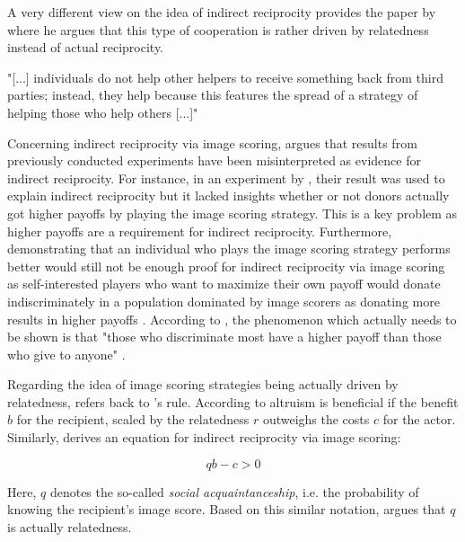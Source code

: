 \documentclass[sigconf]{acmart}
\begin{document}
    A very different view on the idea of indirect reciprocity provides the paper by \citeauthor{roberts_kin_2019} \cite{roberts_kin_2019} where he argues that this type of cooperation is rather driven by relatedness instead of actual reciprocity.

    "[...] individuals do not help other helpers to receive something back from third parties; instead, they help because this features the spread of a strategy of helping those who help others [...]" \cite{roberts_kin_2019}


    Concerning indirect reciprocity via image scoring, \citeauthor{roberts_kin_2019} argues that results from previously conducted experiments have been misinterpreted as evidence for indirect reciprocity.
    For instance, in an experiment by \citeauthor{milinski_reputation_2002} \cite{milinski_reputation_2002}, their result was used to explain indirect reciprocity but it lacked insights whether or not donors actually got higher payoffs by playing the image scoring strategy.
    This is a key problem as higher payoffs are a requirement for indirect reciprocity.
    Furthermore, demonstrating that an individual who plays the image scoring strategy performs better would still not be enough proof for indirect reciprocity via image scoring as self-interested players who want to maximize their own payoff would donate indiscriminately in a population dominated by image scorers as donating more results in higher payoffs \cite{roberts_kin_2019}.
    According to \citeauthor{roberts_kin_2019}, the phenomenon which actually needs to be shown is that "those who discriminate most have a higher payoff than those who give to anyone" \cite{roberts_kin_2019}.

    Regarding the idea of image scoring strategies being actually driven by relatedness, \citeauthor{roberts_kin_2019} refers back to \citeauthor{hamilton_kin_1964}'s rule.
    According to  altruism is beneficial if the benefit $b$ for the recipient, scaled by the relatedness $r$ outweighs the costs $c$ for the actor.
    Similarly, \citeauthor{nowak_five_2006} \cite{nowak_five_2006} derives an equation for indirect reciprocity via image scoring:

    \begin{equation}
        qb - c > 0\label{eq:qb-c}
    \end{equation}

    Here, $q$ denotes the so-called \textit{social acquaintanceship}, i.e. the probability of knowing the recipient's image score.
    Based on this similar notation, \citeauthor{roberts_kin_2019} argues that $q$ is actually relatedness.
\end{document}
